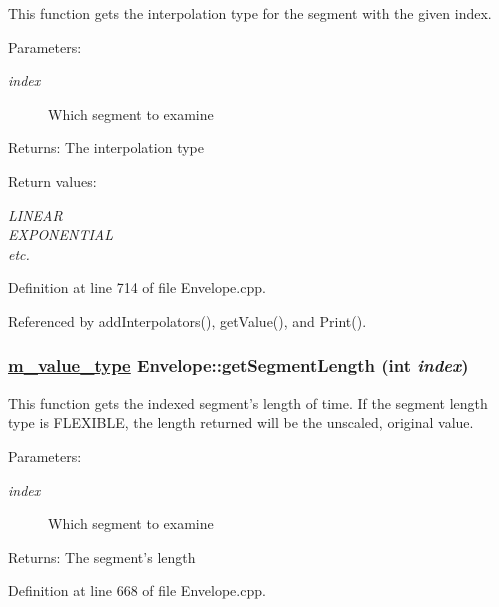 This function gets the interpolation type for the segment with the given index. \begin{Desc}
\item[Parameters:]
\begin{description}
\item[{\em index}]Which segment to examine \end{description}
\end{Desc}
\begin{Desc}
\item[Returns:]The interpolation type \end{Desc}
\begin{Desc}
\item[Return values:]
\begin{description}
\item[{\em LINEAR}]\item[{\em EXPONENTIAL}]\item[{\em etc.}]\end{description}
\end{Desc}


Definition at line 714 of file Envelope.cpp.

Referenced by add\-Interpolators(), get\-Value(), and Print().\hypertarget{classEnvelope_a20}{
\subsubsection[getSegmentLength]{\setlength{\rightskip}{0pt plus 5cm}\hyperlink{Types_8h_a3}{m\_\-value\_\-type} Envelope::get\-Segment\-Length (int {\em index})}}
\label{classEnvelope_a20}


This function gets the indexed segment's length of time. If the segment length type is FLEXIBLE, the length returned will be the unscaled, original value. \begin{Desc}
\item[Parameters:]
\begin{description}
\item[{\em index}]Which segment to examine \end{description}
\end{Desc}
\begin{Desc}
\item[Returns:]The segment's length \end{Desc}


Definition at line 668 of file Envelope.cpp.

